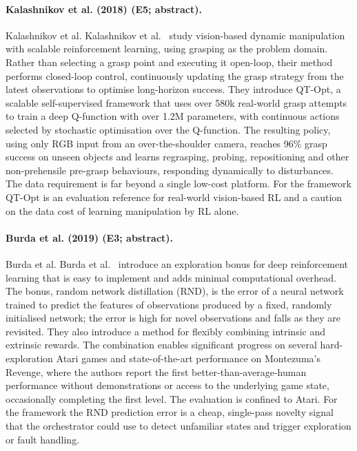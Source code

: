 \documentclass[10pt,a4paper]{article}
\begin{document}
\paragraph{Kalashnikov et al. (2018) (E5; abstract).} Kalashnikov et al. Kalashnikov et al.~\cite{Kalashnikov2018} study vision-based dynamic manipulation with scalable reinforcement learning, using grasping as the problem domain. Rather than selecting a grasp point and executing it open-loop, their method performs closed-loop control, continuously updating the grasp strategy from the latest observations to optimise long-horizon success. They introduce QT-Opt, a scalable self-supervised framework that uses over 580k real-world grasp attempts to train a deep Q-function with over 1.2M parameters, with continuous actions selected by stochastic optimisation over the Q-function. The resulting policy, using only RGB input from an over-the-shoulder camera, reaches 96\% grasp success on unseen objects and learns regrasping, probing, repositioning and other non-prehensile pre-grasp behaviours, responding dynamically to disturbances. The data requirement is far beyond a single low-cost platform. For the framework QT-Opt is an evaluation reference for real-world vision-based RL and a caution on the data cost of learning manipulation by RL alone.

\paragraph{Burda et al. (2019) (E3; abstract).} Burda et al. Burda et al.~\cite{Burda2019} introduce an exploration bonus for deep reinforcement learning that is easy to implement and adds minimal computational overhead. The bonus, random network distillation (RND), is the error of a neural network trained to predict the features of observations produced by a fixed, randomly initialised network; the error is high for novel observations and falls as they are revisited. They also introduce a method for flexibly combining intrinsic and extrinsic rewards. The combination enables significant progress on several hard-exploration Atari games and state-of-the-art performance on Montezuma's Revenge, where the authors report the first better-than-average-human performance without demonstrations or access to the underlying game state, occasionally completing the first level. The evaluation is confined to Atari. For the framework the RND prediction error is a cheap, single-pass novelty signal that the orchestrator could use to detect unfamiliar states and trigger exploration or fault handling.
\end{document}
